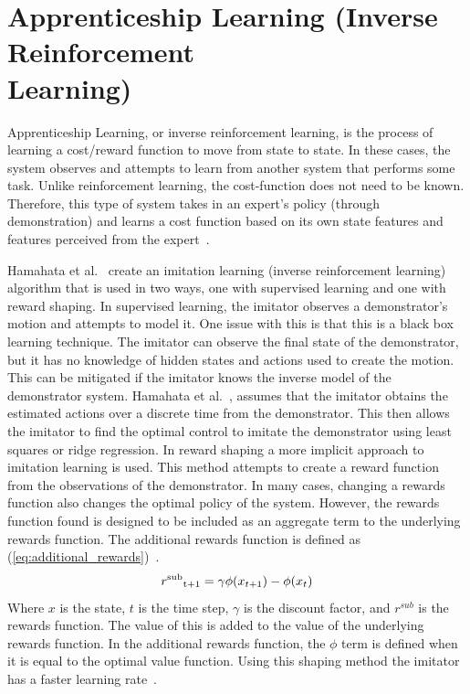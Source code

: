 \documentclass[12pt,american]{report}
\providecommand{\DIFaddend}{} %
\DeclareRobustCommand{\DIFaddend}{\DIFOaddend \let\includegraphics\DIFOincludegraphics} %
\begin{document}
\DIFaddend \section{Apprenticeship Learning (Inverse Reinforcement \\ Learning)}
	Apprenticeship Learning, or inverse reinforcement learning, is the process of learning a cost/reward function to move from state to state. In these cases, the system observes and attempts to learn from another system that performs some task. Unlike reinforcement learning, the cost-function does not need to be known. Therefore, this type of system takes in an expert's policy (through demonstration) and learns a cost function based on its own state features and features perceived from the expert~\cite{jangir_2016}.		

		Hamahata et al.~\cite{hamahata2008effective} create an imitation learning (inverse reinforcement learning) algorithm that is used in two ways, one with supervised learning and one with reward shaping. In supervised learning, the imitator observes a demonstrator's motion and attempts to model it. One issue with this is that this is a black box learning technique.  The imitator can observe the final state of the demonstrator, but it has no knowledge of hidden states and actions used to create the motion. This can be mitigated if the imitator knows the inverse model of the demonstrator system. Hamahata et al.~\cite{hamahata2008effective}, assumes that the imitator obtains the estimated actions over a discrete time from the demonstrator.  This then allows the imitator to find the optimal control to imitate the demonstrator using least squares or ridge regression. In reward shaping a more implicit approach to imitation learning is used. This method attempts to create a reward function from the observations of the demonstrator.  In many cases, changing a rewards function also changes the optimal policy of the system.  However, the rewards function found is designed to be included as an aggregate term to the underlying rewards function. The additional rewards function is defined as (\ref{eq:additional_rewards})~\cite{hamahata2008effective}.
		\begin{equation}
            \label{eq:additional_rewards}
            r\textsuperscript{sub}\textsubscript{t+1}= \gamma\phi(x_{t+1})-\phi(x_{t})
        \end{equation}
		Where $x$ is the state, $t$ is the time step, $\gamma$ is the discount factor, and $r^{sub}$ is the rewards function. The value of this is added to the value of the underlying rewards function. In the additional rewards function, the \textit{$\phi$} term is defined when it is equal to the optimal value function. Using this shaping method the imitator has a faster learning rate~\cite{hamahata2008effective}.
\end{document}

